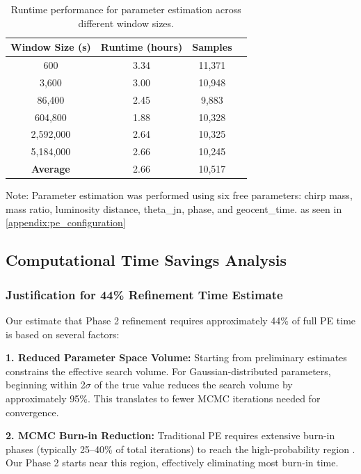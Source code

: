 \documentclass[12pt]{article}
\begin{document}
\begin{table}[ht]
\centering
\caption{Runtime performance for parameter estimation across different window sizes.}
\label{tab:runtime_data}
\begin{tabular}{|c|c|c|c|}
\hline
\textbf{Window Size (s)} & \textbf{Runtime (hours)} & \textbf{Samples} \\
\hline
600 & 3.34 & 11,371  \\
3,600 & 3.00 & 10,948  \\
86,400 & 2.45 & 9,883  \\
604,800 & 1.88 & 10,328  \\
2,592,000 & 2.64 & 10,325  \\
5,184,000 & 2.66 & 10,245  \\
\hline
\textbf{Average} & 2.66 & 10,517  \\
\hline
\end{tabular}
\end{table}

Note: Parameter estimation was performed using six free parameters: chirp mass, mass ratio, luminosity distance, theta\_jn, phase, and geocent\_time. as seen in \ref{appendix:pe_configuration}

\subsection{Computational Time Savings Analysis}
\label{appendix:Computational Time Savings Analysis}

\subsubsection{Justification for 44\% Refinement Time Estimate}

Our estimate that Phase 2 refinement requires approximately 44\% of full PE time is based on several factors:

\textbf{1. Reduced Parameter Space Volume:}
Starting from preliminary estimates constrains the effective search volume. For Gaussian-distributed parameters, beginning within 2$\sigma$ of the true value reduces the search volume by approximately 95\%. This translates to fewer MCMC iterations needed for convergence.

\textbf{2. MCMC Burn-in Reduction:}
Traditional PE requires extensive burn-in phases (typically 25--40\% of total iterations) to reach the high-probability region \cite{Veitch2015}. Our Phase 2 starts near this region, effectively eliminating most burn-in time.
\end{document}
